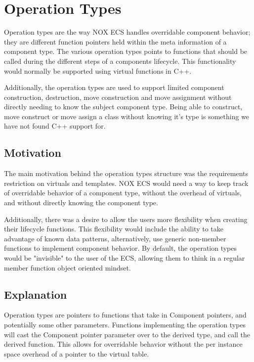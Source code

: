 \section{Operation Types}
\label{subsec:detailed_operation_types}
Operation types are the way NOX ECS handles overridable component behavior; they are different function pointers held within the meta information of a component type.
The various operation types points to functions that should be called during the different steps
of a components lifecycle.
This functionality would normally be supported using virtual functions in C++.

Additionally, the operation types are used to support limited component construction, destruction, move construction and move assignment without directly needing to know the subject component type.
Being able to construct, move construct or move assign a class without knowing it's type
is something we have not found C++ support for.

\subsection{Motivation}
The main motivation behind the operation types structure was the requirements restriction on virtuals
and templates.
NOX ECS would need a way to keep track of overridable behavior of a component type, without the overhead of virtuals,
and without directly knowing the component type.

Additionally, there was a desire to allow the users more flexibility when creating their lifecycle functions.
This flexibility would include the ability to take advantage of known data patterns,
alternatively, use generic non-member functions to implement component behavior.
By default, the operation types would be "invisible" to the user of the ECS, allowing them to think in a regular member function object oriented mindset.

\subsection{Explanation}
Operation types are pointers to functions that take in Component pointers,
and potentially some other parameters.
Functions implementing the operation types will cast the Component pointer parameter over to the derived type,
and call the derived function.
This allows for overridable behavior without the per instance space overhead of a pointer to the virtual table.


